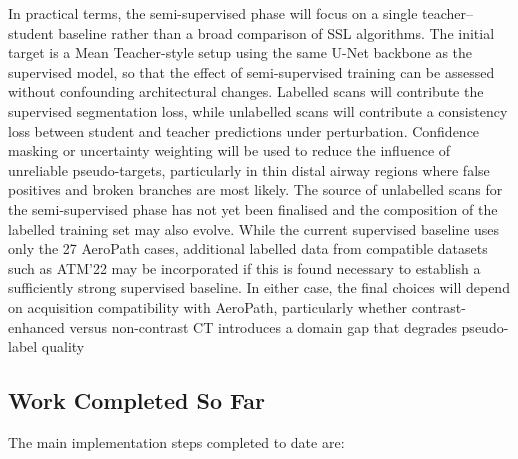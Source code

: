 \documentclass[11pt,a4paper]{article}
\begin{document}
In practical terms, the semi-supervised phase will focus on a single teacher--student baseline rather than a broad comparison of SSL algorithms. The initial target is a Mean Teacher-style setup using the same U-Net backbone as the supervised model, so that the effect of semi-supervised training can be assessed without confounding architectural changes. Labelled scans will contribute the supervised segmentation loss, while unlabelled scans will contribute a consistency loss between student and teacher predictions under perturbation. Confidence masking or uncertainty weighting will be used to reduce the influence of unreliable pseudo-targets, particularly in thin distal airway regions where false positives and broken branches are most likely. The source of unlabelled scans for the semi-supervised phase has not yet been finalised and the composition of the labelled training set may also evolve. While the current supervised baseline uses only the 27 AeroPath cases, additional labelled data from compatible datasets such as ATM'22 may be incorporated if this is found necessary to establish a sufficiently strong supervised baseline. In either case, the final choices will depend on acquisition compatibility with AeroPath, particularly whether contrast-enhanced versus non-contrast CT introduces a domain gap that degrades pseudo-label quality

\subsection{Work Completed So Far}

The main implementation steps completed to date are:
\end{document}
